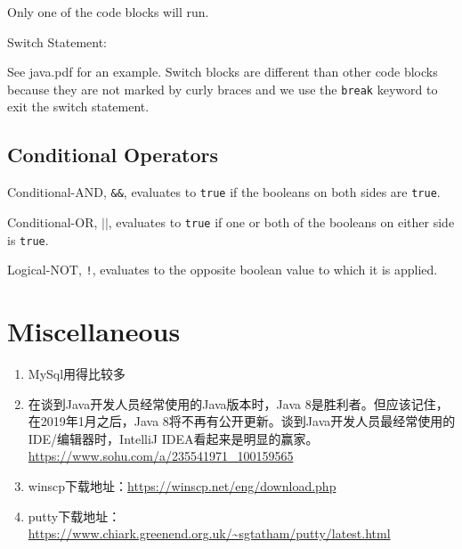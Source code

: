 \documentclass[a4paper, 12pt]{article}
\begin{document}
Only one of the code blocks will run.

\vspace{1.3em}

Switch Statement:

See java.pdf for an example. Switch blocks are different than other code blocks because they are not marked by curly braces and we use the \verb|break| keyword to exit the switch statement.

\subsection{Conditional Operators}
Conditional-AND, \verb|&&|, evaluates to \verb|true| if the booleans on both sides are \verb|true|.

Conditional-OR, $\vert\vert$, evaluates to \verb|true| if one or both of the booleans on either side is \verb|true|.

Logical-NOT, \verb|!|, evaluates to the opposite boolean value to which it is applied.


\section{Miscellaneous}

\begin{enumerate}
\item MySql用得比较多

\item 在谈到Java开发人员经常使用的Java版本时，Java 8是胜利者。但应该记住，在2019年1月之后，Java 8将不再有公开更新。谈到Java开发人员最经常使用的IDE/编辑器时，IntelliJ IDEA看起来是明显的赢家。 \url{https://www.sohu.com/a/235541971_100159565}

\item winscp下载地址：\url{https://winscp.net/eng/download.php}

\item putty下载地址：\url{https://www.chiark.greenend.org.uk/~sgtatham/putty/latest.html}

\end{enumerate}
\end{document}
